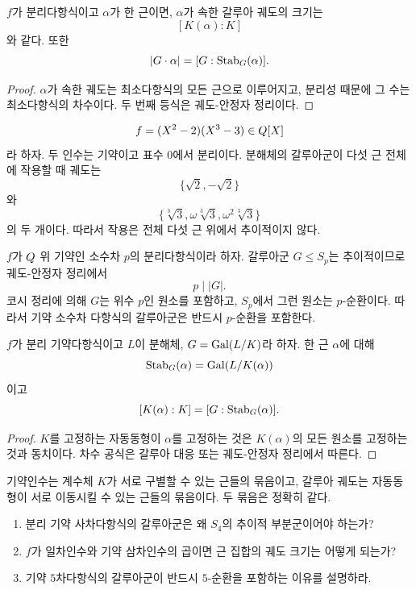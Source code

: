 \begin{corollary}
$f$가 분리다항식이고 $\alpha$가 한 근이면, $\alpha$가 속한 갈루아 궤도의 크기는
\[
  [K(\alpha):K]
\]
와 같다. 또한
\[
  |G\cdot\alpha|
  =[G:\operatorname{Stab}_G(\alpha)].
\]
\end{corollary}

\begin{proof}
$\alpha$가 속한 궤도는 최소다항식의 모든 근으로 이루어지고, 분리성 때문에 그 수는 최소다항식의 차수이다. 두 번째 등식은 궤도-안정자 정리이다.
\end{proof}

\begin{example}
\[
  f=(X^2-2)(X^3-3)\in Q[X]
\]
라 하자. 두 인수는 기약이고 표수 $0$에서 분리이다. 분해체의 갈루아군이 다섯 근 전체에 작용할 때 궤도는
\[
  \{\sqrt2,-\sqrt2\}
\]
와
\[
  \{\sqrt[3]{3},\omega\sqrt[3]{3},\omega^2\sqrt[3]{3}\}
\]
의 두 개이다. 따라서 작용은 전체 다섯 근 위에서 추이적이지 않다.
\end{example}

\begin{example}
$f$가 $Q$ 위 기약인 소수차 $p$의 분리다항식이라 하자. 갈루아군 $G\le S_p$는 추이적이므로 궤도-안정자 정리에서
\[
  p\mid |G|.
\]
코시 정리에 의해 $G$는 위수 $p$인 원소를 포함하고, $S_p$에서 그런 원소는 $p$-순환이다. 따라서 기약 소수차 다항식의 갈루아군은 반드시 $p$-순환을 포함한다.
\end{example}

\begin{proposition}
$f$가 분리 기약다항식이고 $L$이 분해체, $G=\operatorname{Gal}(L/K)$라 하자. 한 근 $\alpha$에 대해
\[
  \operatorname{Stab}_G(\alpha)=\operatorname{Gal}(L/K(\alpha))
\]
이고
\[
  [K(\alpha):K]=[G:\operatorname{Stab}_G(\alpha)].
\]
\end{proposition}

\begin{proof}
$K$를 고정하는 자동동형이 $\alpha$를 고정하는 것은 $K(\alpha)$의 모든 원소를 고정하는 것과 동치이다. 차수 공식은 갈루아 대응 또는 궤도-안정자 정리에서 따른다.
\end{proof}

\begin{keyidea}
기약인수는 계수체 $K$가 서로 구별할 수 있는 근들의 묶음이고, 갈루아 궤도는 자동동형이 서로 이동시킬 수 있는 근들의 묶음이다. 두 묶음은 정확히 같다.
\end{keyidea}

\begin{checkpoint}
\begin{enumerate}[label=(\alph*)]
  \item 분리 기약 사차다항식의 갈루아군은 왜 $S_4$의 추이적 부분군이어야 하는가?
  \item $f$가 일차인수와 기약 삼차인수의 곱이면 근 집합의 궤도 크기는 어떻게 되는가?
  \item 기약 $5$차다항식의 갈루아군이 반드시 $5$-순환을 포함하는 이유를 설명하라.
\end{enumerate}
\end{checkpoint}

